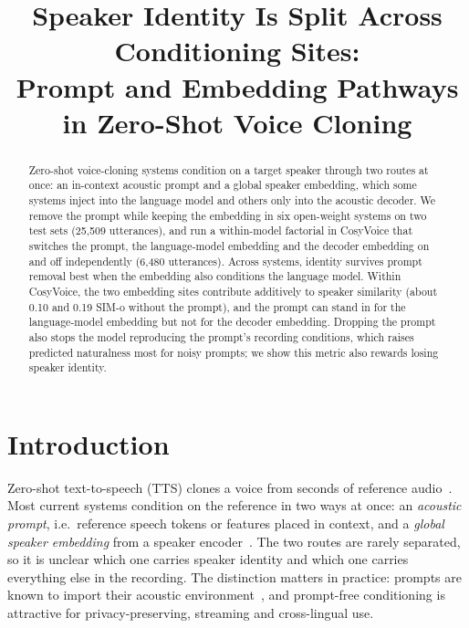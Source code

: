 \documentclass{Interspeech}
\title{Speaker Identity Is Split Across Conditioning Sites:\\
Prompt and Embedding Pathways in Zero-Shot Voice Cloning}
\begin{document}
\maketitle

\begin{abstract}
Zero-shot voice-cloning systems condition on a target speaker through two routes at once: an in-context acoustic prompt and a global speaker embedding, which some systems inject into the language model and others only into the acoustic decoder. We remove the prompt while keeping the embedding in six open-weight systems on two test sets (25{,}509 utterances), and run a within-model factorial in CosyVoice that switches the prompt, the language-model embedding and the decoder embedding on and off independently (6{,}480 utterances). Across systems, identity survives prompt removal best when the embedding also conditions the language model. Within CosyVoice, the two embedding sites contribute additively to speaker similarity (about 0.10 and 0.19 SIM-o without the prompt), and the prompt can stand in for the language-model embedding but not for the decoder embedding. Dropping the prompt also stops the model reproducing the prompt's recording conditions, which raises predicted naturalness most for noisy prompts; we show this metric also rewards losing speaker identity.
\end{abstract}

\section{Introduction}
\label{sec:intro}

Zero-shot text-to-speech (TTS) clones a voice from seconds of reference audio~\cite{valle,seedtts,voicebox,qwen3tts}.
Most current systems condition on the reference in two ways at once: an \emph{acoustic prompt}, i.e.\ reference speech tokens or features placed in context, and a \emph{global speaker embedding} from a speaker encoder~\cite{cosyvoice,cosyvoice2,cosyvoice3,xtts}.
The two routes are rarely separated, so it is unclear which one carries speaker identity and which one carries everything else in the recording.
The distinction matters in practice: prompts are known to import their acoustic environment~\cite{lu2025noise,wang2024noise}, and prompt-free conditioning is attractive for privacy-preserving, streaming and cross-lingual use.
\end{document}
